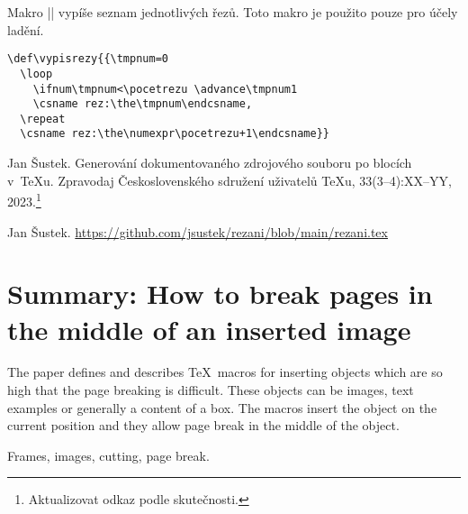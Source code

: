 \documentclass[oldcsbabel]{csbulletin}
\def\JSvfil{\vfil}
\def\JSvss{\vskip0ptminus12pt}
\def\JSbreak{\break}
\def\TODO#1{{\color{red}\footnote{\color{red}{\bf TODO:} \ignorespaces#1}}}
\begin{document}
Makro |\vypisrezy| vypíše seznam jednotlivých řezů. Toto makro je použito pouze pro účely ladění.
\begin{Verbatim}
\def\vypisrezy{{\tmpnum=0
  \loop
    \ifnum\tmpnum<\pocetrezu \advance\tmpnum1
    \csname rez:\the\tmpnum\endcsname,
  \repeat
  \csname rez:\the\numexpr\pocetrezu+1\endcsname}}
\end{Verbatim}









\def\refname{Seznam literatury}
\begin{thebibliography}{9}
\raggedright

Jan Šustek. Generování dokumentovaného zdrojového souboru po blocích v~\TeX u. Zpravodaj Československého sdružení uživatelů \TeX u, 33(3--4):XX--YY, 2023.\TODO{Aktualizovat odkaz podle skutečnosti.}

Jan Šustek.
\url{https://github.com/jsustek/rezani/blob/main/rezani.tex}

\end{thebibliography}



\section*{Summary: How to break pages in the middle of an inserted image}

The paper defines and describes \TeX\ macros for inserting objects which are so high that the page breaking is difficult. These objects can be images, text examples or generally a content of a box. The macros insert the object on the current position and they allow page break in the middle of the object.

\medskip

Frames, images, cutting, page break.
\end{document}
